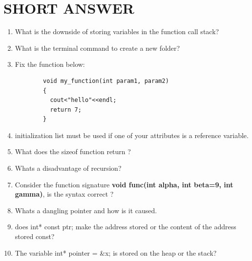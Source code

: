 \documentclass[a4paper]{article}
\begin{document}
\section{SHORT ANSWER}
\begin{enumerate}
    \item What is the downside of storing variables in the function call stack?
    \item What is the terminal command to create a new folder?
    \item Fix the function below: 
    \begin{verbatim}
        void my_function(int param1, param2)
        {
          cout<"hello"<<endl;
          return 7;
        }
    \end{verbatim}
          
    \item initialization list must be used if one of your attributes is a reference variable.
    \item What does the sizeof function return ?
    \item Whats a disadvantage of recursion?
    \item Consider the function signature \textbf{void func(int alpha, int beta=9, int gamma)}, is the syntax correct ?
    \item Whats a dangling pointer and how is it caused.
    \item does int* const ptr; make the address stored or the content of the address stored const?
    \item The variable int* pointer = \&x; is stored on the heap or the stack?
\end{enumerate}
\newpage 
\end{document}

